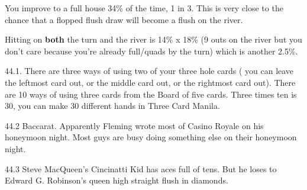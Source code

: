 You improve to a full house 34\% of the time, 1 in 3. This is very close
to the chance that a flopped flush draw will become a flush on the river.

Hitting on \textbf{both} the turn and the river is 14\% x 18\% (9 outs
on the river but you don't care because you're already full/quads by
the turn) which is another 2.5\%.

44.1. There are three ways of using two of your three hole
cards ( you can leave the leftmost card out, or the middle card out,
or the rightmost card out). There are 10 ways of using three cards
from the Board of five cards. Three times ten is 30, you can make 30
different hands in Three Card Manila.

44.2 Baccarat. Apparently Fleming wrote most of Casino Royale
on his honeymoon night. Most guys are busy doing something else
on their honeymoon night.

44.3 Steve MacQueen's Cincinatti Kid has aces full of tens. But he
loses to Edward G. Robinson's queen high straight flush in diamonds.
